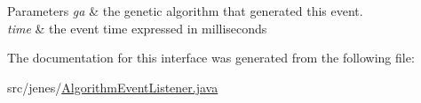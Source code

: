 \begin{DoxyParams}{Parameters}
{\em ga} & the genetic algorithm that generated this event. \\
\hline
{\em time} & the event time expressed in milliseconds \\
\hline
\end{DoxyParams}


The documentation for this interface was generated from the following file\-:\begin{DoxyCompactItemize}
\item 
src/jenes/\hyperlink{_algorithm_event_listener_8java}{Algorithm\-Event\-Listener.\-java}\end{DoxyCompactItemize}

